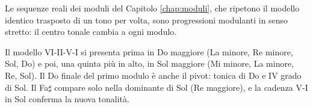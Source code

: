 Le sequenze reali dei moduli del Capitolo \ref{chap:moduli}, che ripetono il modello identico trasposto di un tono per volta, sono progressioni modulanti in senso stretto: il centro tonale cambia a ogni modulo.

\begin{esempio}
	\label{ex:progressione_modulante}
	Il modello VI-II-V-I si presenta prima in Do maggiore (La minore, Re minore, Sol, Do) e poi, una quinta più in alto, in Sol maggiore (Mi minore, La minore, Re, Sol). Il Do finale del primo modulo è anche il pivot: tonica di Do e IV grado di Sol. Il Fa$\sharp$ compare solo nella dominante di Sol (Re maggiore), e la cadenza V-I in Sol conferma la nuova tonalità.
\end{esempio}
